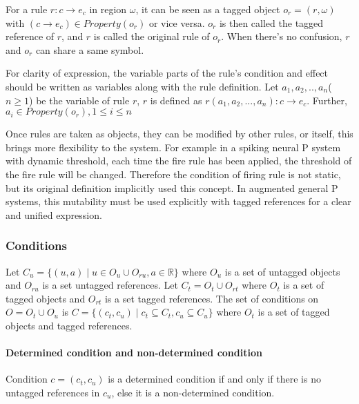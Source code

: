 \documentclass[9pt,a4paper,twoside]{article}
\begin{document}
            For a rule $r: c \rightarrow e_c$ in region $\omega$, it can be seen as a tagged object $o_r = (r, \omega)$ with $(c \rightarrow e_c) \in Property(o_r)$
            or vice versa. $o_r$ is then called the tagged reference of $r$, and $r$ is called the original rule of $o_r$. When there's no confusion, $r$ and $o_r$
            can share a same symbol.
        
            For clarity of expression, the variable parts of the rule's condition and effect should be written as variables along with the rule definition. Let
            $a_1, a_2,..,a_n$($n \geq 1$) be the variable of rule $r$, $r$ is defined as $r(a_1, a_2,...,a_n): c \rightarrow e_c$.
            Further, $a_i \in Property(o_r), 1 \leq i \leq n$
        
            Once rules are taken as objects, they can be modified by other rules, or itself, this brings more flexibility to the system. For example in a spiking neural  
            P system with dynamic threshold, each time the fire rule has been applied, the threshold of the fire rule will be changed. Therefore the condition of firing
            rule is not static, but its original definition implicitly used this concept. In augmented general P systems, this mutability must be used explicitly with
            tagged references for a clear and unified expression.
        
        \subsubsection{Conditions}
        
            Let $C_u = \{(u, a) \mid u \in O_u \cup O_{ru}, a \in \mathbb{R}\}$ where $O_u$ is a set of untagged objects and $O_{ru}$ is a set untagged references.
            Let $C_t = O_t \cup O_{rt}$ where $O_t$ is a set of tagged objects and $O_{rt}$ is a set tagged references.
            The set of conditions on $O = O_t \cup O_u$ is $C = \{(c_t, c_u) \mid c_t \subseteq C_t, c_u \subseteq C_u\}$ 
            where $O_t$ is a set of tagged objects and tagged references.
        
            \paragraph{Determined condition and non-determined condition}
                Condition $c=(c_t, c_u)$ is a determined condition if and only if there is no untagged references in
                $c_u$, else it is a non-determined condition.  
                
\end{document}
